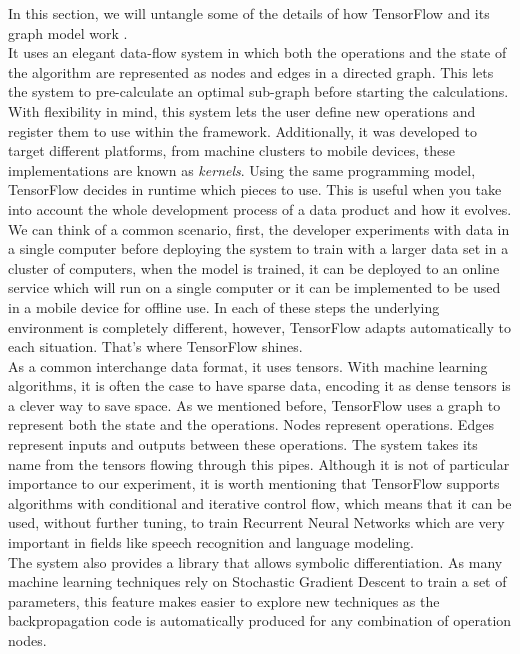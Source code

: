 In this section, we will untangle some of the details of how TensorFlow and its graph model work \cite{DBLP:journals/corr/AbadiBCCDDDGIIK16}.\\

It uses an elegant data-flow system in which both the operations and the state of the algorithm are represented as nodes and edges in a directed graph. This lets the system to pre-calculate an optimal sub-graph before starting the calculations.\\

With flexibility in mind, this system lets the user define new operations and register them to use within the framework. Additionally, it was developed to target different platforms, from machine clusters to mobile devices, these implementations are known as \textit{kernels}. Using the same programming model, TensorFlow decides in runtime which pieces to use. This is useful when you take into account the whole development process of a data product and how it evolves. We can think of a common scenario, first, the developer experiments with data in a single computer before deploying the system to train with a larger data set in a cluster of computers, when the model is trained, it can be deployed to an online service which will run on a single computer or it can be implemented to be used in a mobile device for offline use. In each of these steps the underlying environment is completely different, however, TensorFlow adapts automatically to each situation. That's where TensorFlow shines.\\


As a common interchange data format, it uses tensors. With machine learning algorithms, it is often the case to have sparse data, encoding it as dense tensors is a clever way to save space. As we mentioned before, TensorFlow uses a graph to represent both the state and the operations. Nodes represent operations. Edges represent inputs and outputs between these operations. The system takes its name from the tensors flowing through this pipes. Although it is not of particular importance to our experiment, it is worth mentioning that TensorFlow supports algorithms with conditional and iterative control flow, which means that it can be used, without further tuning, to train Recurrent Neural Networks which are very important in fields like speech recognition and language modeling.\\

The system also provides a library that allows symbolic differentiation. As many machine learning techniques rely on Stochastic Gradient Descent to train a set of parameters, this feature makes easier to explore new techniques as the backpropagation code is automatically produced for any combination of operation nodes.\\

